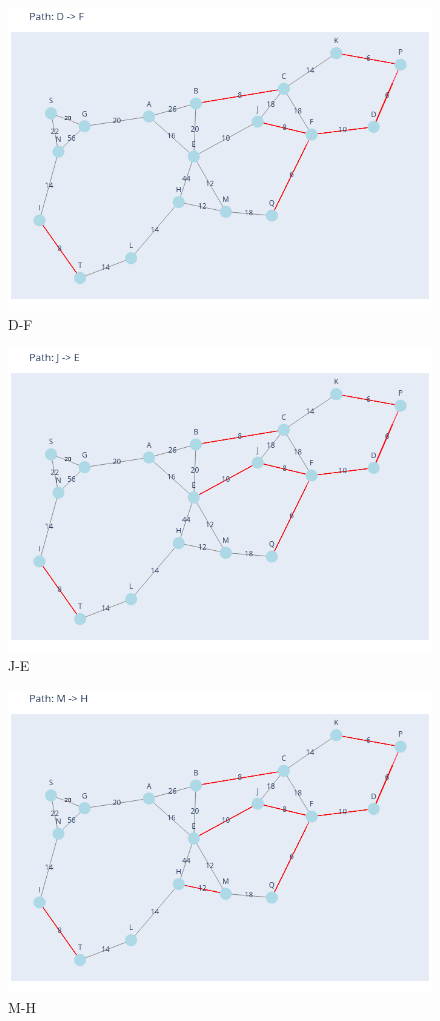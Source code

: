 \documentclass[11pt]{book}
\renewcommand{\=}[1]{\stackrel{#1}{=}} %
\theoremstyle{definition}
\theoremstyle{remark}
\begin{document}
\begin{figure}
    \centering
    \includegraphics[width=1\linewidth]{Trenches/7.png}
    \caption{D-F}
    \label{fig:enter-label}
\end{figure}
\begin{figure}
    \centering
    \includegraphics[width=1\linewidth]{Trenches/8.png}
    \caption{J-E}
    \label{fig:enter-label}
\end{figure}
\begin{figure}
    \centering
    \includegraphics[width=1\linewidth]{Trenches/9.png}
    \caption{M-H}
    \label{fig:enter-label}
\end{figure}
\end{document}
